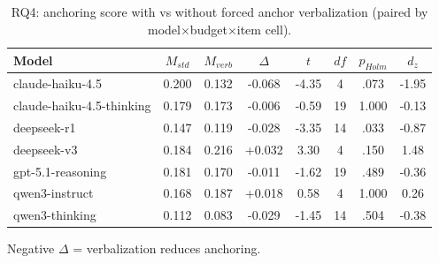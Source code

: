 \begin{table}[t]
\centering
\caption{RQ4: anchoring score with vs without forced anchor verbalization (paired by model$\times$budget$\times$item cell).}
\label{tab:rq4}
\small
\begin{tabular}{lccccccc}
\hline
Model & $M_{std}$ & $M_{verb}$ & $\Delta$ & $t$ & $df$ & $p_{Holm}$ & $d_z$ \\
\hline
claude-haiku-4.5 & 0.200 & 0.132 & -0.068 & -4.35 & 4 & .073 & -1.95 \\
claude-haiku-4.5-thinking & 0.179 & 0.173 & -0.006 & -0.59 & 19 & 1.000 & -0.13 \\
deepseek-r1 & 0.147 & 0.119 & -0.028 & -3.35 & 14 & .033 & -0.87 \\
deepseek-v3 & 0.184 & 0.216 & +0.032 & 3.30 & 4 & .150 & 1.48 \\
gpt-5.1-reasoning & 0.181 & 0.170 & -0.011 & -1.62 & 19 & .489 & -0.36 \\
qwen3-instruct & 0.168 & 0.187 & +0.018 & 0.58 & 4 & 1.000 & 0.26 \\
qwen3-thinking & 0.112 & 0.083 & -0.029 & -1.45 & 14 & .504 & -0.38 \\
\hline
\end{tabular}
\par\smallskip\footnotesize Negative $\Delta$ = verbalization reduces anchoring.
\end{table}
